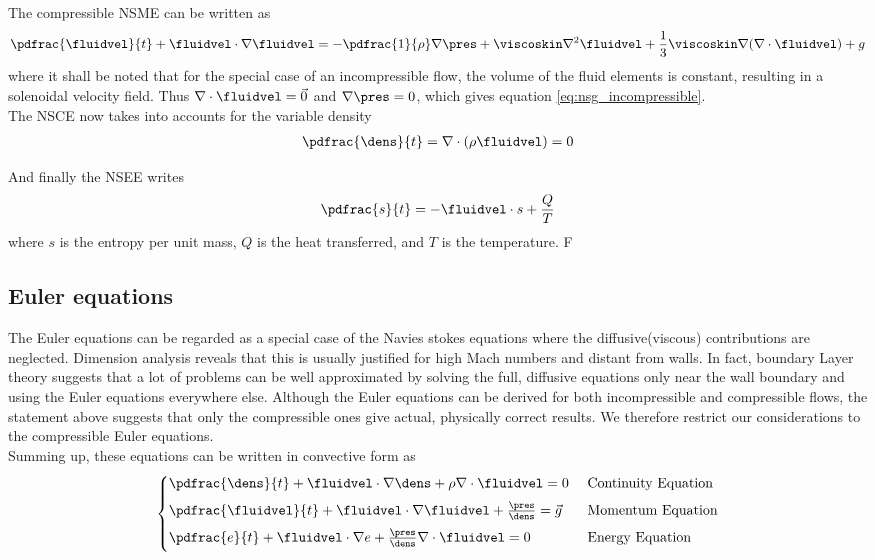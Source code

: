 \documentclass[../main.tex]{subfiles}
\begin{document}
The compressible \ac{NSME} can be written as
\begin{align}\label{eq:nsg_compressible}
\pdfrac{\fluidvel}{t} +
\fluidvel\cdot\nabla\fluidvel =
-\pdfrac{1}{\rho}\nabla\pres +
\viscoskin\nabla^2\fluidvel +
\frac{1}{3} \viscoskin\nabla(\nabla\cdot\fluidvel) +
g
\end{align}
where it shall be noted that for the special case of an incompressible flow, the volume of the fluid elements is constant, resulting in a solenoidal velocity field. Thus $\nabla\cdot\fluidvel=\vec{0}$ and $\nabla\pres=0$, which gives equation \ref{eq:nsg_incompressible}.
\\
The \ac{NSCE} now takes into accounts for the variable density
\begin{align}
\pdfrac{\dens}{t}=\nabla\cdot(\rho\fluidvel)=0
\end{align}

And finally the \ac{NSEE} writes
\begin{align}
\pdfrac{s}{t}=-\fluidvel\cdot s + \frac{Q}{T}
\end{align}
where $s$ is the entropy per unit mass, $Q$ is the heat transferred, and $T$ is the temperature.
F

\subsection{Euler equations}\label{sec:euler_convective}
The Euler equations can be regarded as a special case of the Navies stokes equations where the diffusive(viscous) contributions are neglected. Dimension analysis \cite{Doering1995} reveals that this is usually justified for high Mach numbers and distant from walls. In fact, boundary Layer theory suggests that a lot of problems can be well approximated by solving the full, diffusive equations only near the wall boundary and using the Euler equations everywhere else.
Although the Euler equations can be derived for both incompressible and compressible flows, the statement above suggests that only the compressible ones give actual, physically correct results. We therefore restrict our considerations to the compressible Euler equations.\\
Summing up, these equations can be written in convective form as
\begin{align}
\begin{cases}
\pdfrac{\dens}{t}+\fluidvel\cdot\nabla\dens+\rho\nabla\cdot\fluidvel = 0           &\text{ Continuity Equation} \\[0.5em]
\pdfrac{\fluidvel}{t}+\fluidvel\cdot\nabla\fluidvel+\frac{\pres}{\dens} = \vec{g}  &\text{ Momentum Equation} \\[0.5em]
\pdfrac{e}{t}+\fluidvel\cdot\nabla e + \frac{\pres}{\dens}\nabla\cdot\fluidvel = 0 &\text{ Energy Equation} \\[0.5em]
\end{cases}
\end{align}
\end{document}
